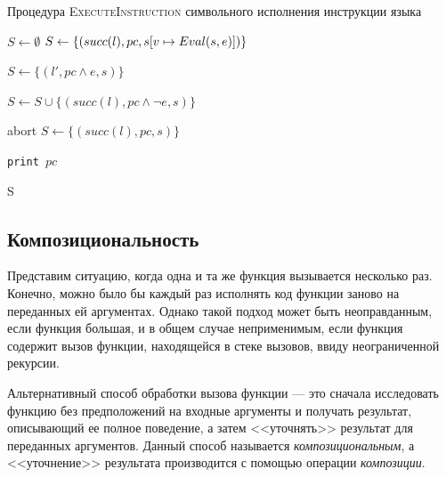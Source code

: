 \begin{algorithm}
    \caption{Процедура \textsc{ExecuteInstruction} символьного исполнения инструкции языка} 
    \label{execute_instruction}
\begin{algorithmic}[1]
        \State $S \gets \emptyset$
                \State $S \gets \{(succ(l),pc,s[v\mapsto Eval(s, e)])\}$
            \EndCase

                    \State $S \gets \{(l', pc \land e, s)\}$
                \EndIf

                    \State $S \gets S\cup\{(succ(l), pc \land \neg e, s)\}$
                \EndIf
            \EndCase

             \label{executeInsOriginalAlgoAssert}
                    \State abort
                \Else
                    \State $S \gets \{(succ(l),pc,s)\}$
                \EndIf
            \EndCase 

                \State \texttt{print $pc$ }
            \EndCase
        \EndSwitch

        \State \Return S
    \EndProcedure
\end{algorithmic}
\end{algorithm}


\subsection{Композициональность}
Представим ситуацию, когда одна и та же функция вызывается несколько раз.
Конечно, можно было бы каждый раз исполнять код функции заново на переданных ей аргументах. 
Однако такой подход может быть неоправданным, если функция большая, и в общем случае неприменимым, 
если функция содержит вызов функции, находящейся в стеке вызовов, ввиду неограниченной рекурсии.  

Альтернативный способ обработки вызова функции --- это сначала исследовать функцию без предположений на входные аргументы
и получать результат, описывающий ее полное поведение, а затем <<уточнять>> результат для переданных аргументов.
Данный способ называется \emph{композициональным}, а <<уточнение>> результата производится с помощью операции \emph{композиции}.

